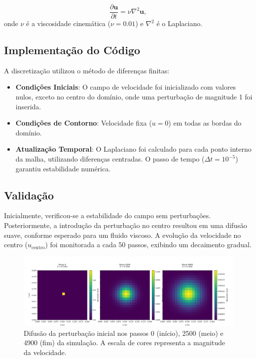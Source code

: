 \documentclass[a4paper, 12pt]{article}
\begin{document}
	\[  
	\frac{\partial \mathbf{u}}{\partial t} = \nu \nabla^2 \mathbf{u},  
	\]  
	onde \( \nu \) é a viscosidade cinemática (\( \nu = 0.01 \)) e \( \nabla^2 \) é o Laplaciano.  
	
	\subsection{Implementação do Código}  
	A discretização utilizou o método de diferenças finitas:  
	\begin{itemize}  
		\item \textbf{Condições Iniciais}: O campo de velocidade foi inicializado com valores nulos, exceto no centro do domínio, onde uma perturbação de magnitude 1 foi inserida.  
		\item \textbf{Condições de Contorno}: Velocidade fixa (\( u = 0 \)) em todas as bordas do domínio.  
		\item \textbf{Atualização Temporal}: O Laplaciano foi calculado para cada ponto interno da malha, utilizando diferenças centradas. O passo de tempo (\( \Delta t = 10^{-5} \)) garantiu estabilidade numérica.  
	\end{itemize}  
	
	\subsection{Validação}  
	Inicialmente, verificou-se a estabilidade do campo sem perturbações. Posteriormente, a introdução da perturbação no centro resultou em uma difusão suave, conforme esperado para um fluido viscoso. A evolução da velocidade no centro (\( u_{\text{centro}} \)) foi monitorada a cada 50 passos, exibindo um decaimento gradual.  
	
	\begin{figure}[h]
		\centering
		\includegraphics[width=\linewidth]{imgs/Figure_1.png}
		\caption{Difusão da perturbação inicial nos passos 0 (início), 2500 (meio) e 4900 (fim) da simulação. A escala de cores representa a magnitude da velocidade.}
	\end{figure}
	
\end{document}
